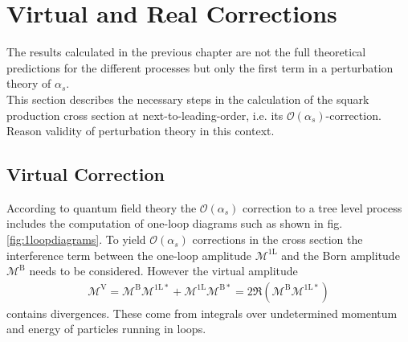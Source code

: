 \section{Virtual and Real Corrections}
The results calculated in the previous chapter are not the full theoretical predictions for the different processes but only the first term in a perturbation theory of $\alpha_s$.\\
This section describes the necessary steps in the calculation of the squark production cross section at next-to-leading-order, i.e. its $\mathcal{O}(\alpha_s)$-correction.\\
Reason validity of perturbation theory in this context.


\subsection{Virtual Correction}
According to quantum field theory the $\mathcal{O}(\alpha_s)$ correction to a tree level process includes the computation of one-loop diagrams such as shown in fig. \ref{fig:1loopdiagrams}. To yield $\mathcal{O}(\alpha_s)$ corrections in the cross section the interference term between the one-loop amplitude $\mathcal{M}^{\mathrm{1L}}$ and the Born amplitude $\mathcal{M}^{\mathrm{B}}$ needs to be considered. However the virtual amplitude 
\begin{align}
\mathcal{M}^{\mathrm{V}} = \mathcal{M}^{\mathrm{B}} \mathcal{M}^{\mathrm{1L}\ast} + \mathcal{M}^{\mathrm{1L}} \mathcal{M}^{\mathrm{B}\ast} = 2 \Re \left( \mathcal{M}^{\mathrm{B}} \mathcal{M}^{\mathrm{1L}\ast} \right)
\end{align}
contains divergences. These come from integrals over undetermined momentum and energy of particles running in loops.
